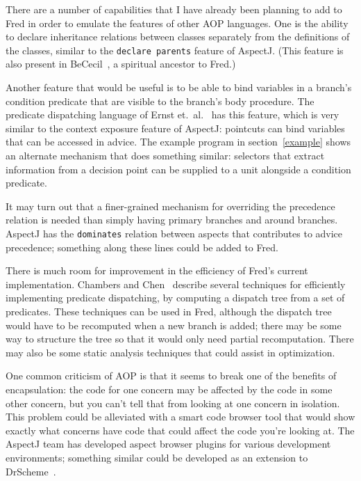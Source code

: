 \documentclass{article}
\newcommand{\code}[1]{\texttt{#1}}
\begin{document}
There are a number of capabilities that I have already been planning to
add to Fred in order to emulate the features of other AOP languages.
One is the ability to declare inheritance relations between classes
separately from the definitions of the classes, similar to the
\code{declare parents} feature of AspectJ.  (This feature is also
present in BeCecil~\cite{BeCecil}, a spiritual ancestor to Fred.)

Another feature that would be useful is to be able to bind variables
in a branch's condition predicate that are visible to the branch's
body procedure.  The predicate dispatching language of Ernst
et.~al.~\cite{predicate-dispatch} has this feature, which is very
similar to the context exposure feature of AspectJ: pointcuts can bind
variables that can be accessed in advice.  The example program in
section~\ref{example} shows an alternate mechanism that does something
similar: selectors that extract information from a decision point can
be supplied to a unit alongside a condition predicate.

It may turn out that a finer-grained mechanism for overriding the
precedence relation is needed than simply having primary branches and
around branches.  AspectJ has the \code{dominates} relation between
aspects that contributes to advice precedence; something along these
lines could be added to Fred.

There is much room for improvement in the efficiency of Fred's current
implementation.  Chambers and Chen~\cite{efficient-pd} describe
several techniques for efficiently implementing predicate dispatching,
by computing a dispatch tree from a set of predicates.  These
techniques can be used in Fred, although the dispatch tree would have
to be recomputed when a new branch is added; there may be some way to
structure the tree so that it would only need partial recomputation.
There may also be some static analysis techniques that could assist in
optimization.

One common criticism of AOP is that it seems to break one of the
benefits of encapsulation: the code for one concern may be affected by
the code in some other concern, but you can't tell that from looking
at one concern in isolation.  This problem could be alleviated with a
smart code browser tool that would show exactly what concerns have
code that could affect the code you're looking at.  The AspectJ team
has developed aspect browser plugins for various development
environments; something similar could be developed as an extension to
DrScheme~\cite{DrScheme}.
\end{document}
